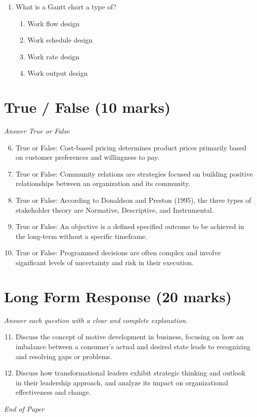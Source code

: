 \documentclass[12pt]{article}
\begin{document}
\begin{enumerate}[label=\arabic*.]
\begin{enumerate}[label=(\alph*)]
    \item Sponsorships.
    \item Exhibitions.
    \item Branded content.
    \item Advertisement.
\end{enumerate}
\item What is a Gantt chart a type of?
\begin{enumerate}[label=(\alph*)]
    \item Work flow design
    \item Work schedule design
    \item Work rate design
    \item Work output design
\end{enumerate}
\end{enumerate}

\section*{True / False (10 marks)}
\textit{Answer True or False}
\begin{enumerate}[label=\arabic*.]
\setcounter{enumi}{5}
\item True or False: Cost-based pricing determines product prices primarily based on customer preferences and willingness to pay.
\item True or False: Community relations are strategies focused on building positive relationships between an organization and its community.
\item True or False: According to Donaldson and Preston (1995), the three types of stakeholder theory are Normative, Descriptive, and Instrumental.
\item True or False: An objective is a defined specified outcome to be achieved in the long-term without a specific timeframe.
\item True or False: Programmed decisions are often complex and involve significant levels of uncertainty and risk in their execution.
\end{enumerate}

\section*{Long Form Response (20 marks)}
\textit{Answer each question with a clear and complete explanation.}
\begin{enumerate}[label=\arabic*.]
\setcounter{enumi}{10}
\item Discuss the concept of motive development in business, focusing on how an imbalance between a consumer's actual and desired state leads to recognizing and resolving gaps or problems.
\item Discuss how transformational leaders exhibit strategic thinking and outlook in their leadership approach, and analyze its impact on organizational effectiveness and change.
\end{enumerate}

\vfill
\noindent\textit{End of Paper}
\end{document}
